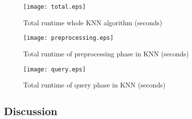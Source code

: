 \begin{figure}[htb]
    \texttt{[image: total.eps]}
    \caption{Total runtime whole KNN algorithm (seconds)}
    \label{fig:total}
\end{figure}

\begin{figure}[htb]
    \texttt{[image: preprocessing.eps]}
    \caption{Total runtime of preprocessing phase in KNN (seconds)}
    \label{fig:preprocess}
\end{figure}


\begin{figure}[htb]
    \texttt{[image: query.eps]}
    \caption{Total runtime of query phase in KNN (seconds)}
    \label{fig:query}
\end{figure}


\subsection{Discussion}
\label{sec:history}
